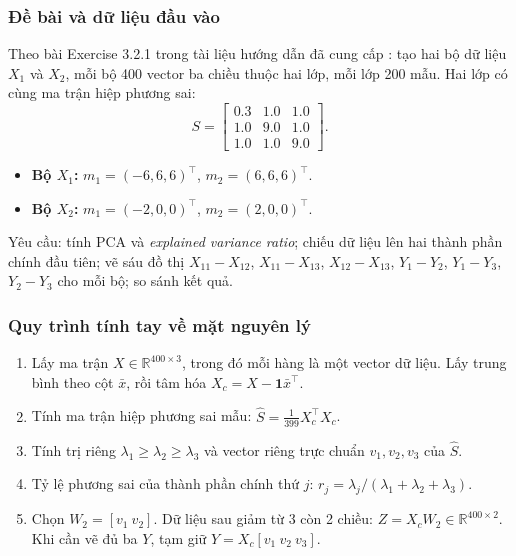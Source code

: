 \subsubsection{Đề bài và dữ liệu đầu vào}
Theo bài Exercise 3.2.1 trong tài liệu hướng dẫn đã cung cấp : tạo hai bộ dữ liệu \(X_1\) và \(X_2\), mỗi bộ 400 vector ba chiều thuộc hai lớp, mỗi lớp 200 mẫu. Hai lớp có cùng ma trận hiệp phương sai:
\[
S=\begin{bmatrix}0.3&1.0&1.0\\1.0&9.0&1.0\\1.0&1.0&9.0\end{bmatrix}.
\]
\begin{itemize}
\item \textbf{Bộ \(X_1\):} \(m_1=(-6,6,6)^\top\), \(m_2=(6,6,6)^\top\).
\item \textbf{Bộ \(X_2\):} \(m_1=(-2,0,0)^\top\), \(m_2=(2,0,0)^\top\).
\end{itemize}
Yêu cầu: tính PCA và \textit{explained variance ratio}; chiếu dữ liệu lên hai thành phần chính đầu tiên; vẽ sáu đồ thị \(X_{11}\! -\! X_{12}\), \(X_{11}\! -\! X_{13}\), \(X_{12}\! -\! X_{13}\), \(Y_1\! -\! Y_2\), \(Y_1\! -\! Y_3\), \(Y_2\! -\! Y_3\) cho mỗi bộ; so sánh kết quả.
\subsubsection{Quy trình tính tay về mặt nguyên lý}
\begin{enumerate}
\item Lấy ma trận \(X\in\mathbb R^{400\times3}\), trong đó mỗi hàng là một vector dữ liệu. Lấy trung bình theo cột \(\bar x\), rồi tâm hóa \(X_c=X-\mathbf{1}\bar x^\top\).
\item Tính ma trận hiệp phương sai mẫu: \(\widehat S=\frac1{399}X_c^\top X_c\).
\item Tính trị riêng \(\lambda_1\ge\lambda_2\ge\lambda_3\) và vector riêng trực chuẩn \(v_1,v_2,v_3\) của \(\widehat S\).
\item Tỷ lệ phương sai của thành phần chính thứ \(j\): \(r_j=\lambda_j/(\lambda_1+\lambda_2+\lambda_3)\).
\item Chọn \(W_2=[v_1\ v_2]\). Dữ liệu sau giảm từ 3 còn 2 chiều: \(Z=X_cW_2\in\mathbb R^{400\times2}\). Khi cần vẽ đủ ba \(Y\), tạm giữ \(Y=X_c[v_1\ v_2\ v_3]\).
\end{enumerate}
